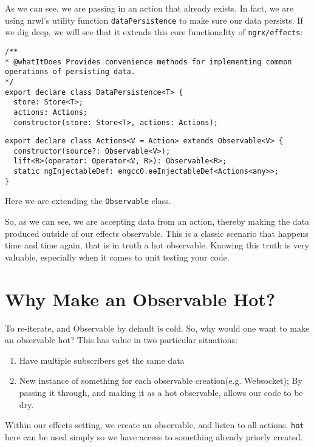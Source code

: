 As we can see, we are passing in an action that already exists. In fact, we are using nrwl's utility function \lstinline{dataPersistence} to make sure our data persists. If we dig deep, we will see that it extends this core functionality of \lstinline{ngrx/effects}: 
\begin{lstlisting}[caption=data-persistence.d.ts file from nrwl library]
/**
* @whatItDoes Provides convenience methods for implementing common operations of persisting data.
*/
export declare class DataPersistence<T> {
  store: Store<T>;
  actions: Actions;
  constructor(store: Store<T>, actions: Actions);  
\end{lstlisting}

\begin{lstlisting}[caption=actions.d.ts file from ngrx/effects library]
export declare class Actions<V = Action> extends Observable<V> {
  constructor(source?: Observable<V>);
  lift<R>(operator: Operator<V, R>): Observable<R>;
  static ngInjectableDef: ɵngcc0.ɵɵInjectableDef<Actions<any>>;
}  
\end{lstlisting}

Here we are extending the \lstinline{Observable} class. 

So, as we can see, we are accepting data from an action, thereby making the data produced outside of our effects observable. This is a classic scenario that happens time and time again, that is in truth a hot observable. Knowing this truth is very valuable, especially when it comes to unit testing your code.

\section{Why Make an Observable Hot?}
To re-iterate, and Observable by default is cold. So, why would one want to make an observable hot? This has value in two particular situations: 
\begin{enumerate}
  \item Have multiple subscribers get the same data
  \item New instance of something for each observable creation(e.g. Websocket); By passing it through, and making it as a hot observable, allows our code to be dry.
\end{enumerate}

Within our effects setting, we create an observable, and listen to all actions.
\lstinline{hot} here can be used simply so we have access to something already 
priorly created.